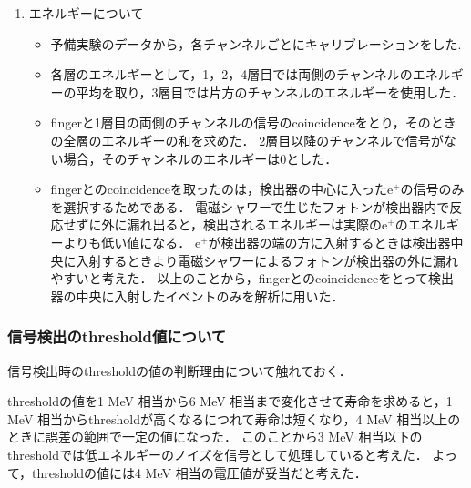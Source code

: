 \begin{enumerate}
\begin{itemize}
	 \end{itemize}
   \item エネルギーについて
	 \begin{itemize}
	  \item 予備実験のデータから，各チャンネルごとにキャリブレーションをした.%
	  \item 各層のエネルギーとして，1，2，4層目では両側のチャンネルのエネルギーの平均を取り，3層目では片方のチャンネルのエネルギーを使用した．
	  \item fingerと1層目の両側のチャンネルの信号のcoincidenceをとり，そのときの全層のエネルギーの和を求めた．
		2層目以降のチャンネルで信号がない場合，そのチャンネルのエネルギーは0とした．
	  \item fingerとのcoincidenceを取ったのは，検出器の中心に入ったe$^{+}$の信号のみを選択するためである．
		電磁シャワーで生じたフォトンが検出器内で反応せずに外に漏れ出ると，検出されるエネルギーは実際のe$^{+}$のエネルギーよりも低い値になる．
		e$^{+}$が検出器の端の方に入射するときは検出器中央に入射するときより電磁シャワーによるフォトンが検出器の外に漏れやすいと考えた．
		以上のことから，fingerとのcoincidenceをとって検出器の中央に入射したイベントのみを解析に用いた．
	 \end{itemize}
  \end{enumerate}
  
  \subsubsection{信号検出のthreshold値について}
  信号検出時のthresholdの値の判断理由について触れておく．
  
  thresholdの値を1 MeV 相当から6 MeV 相当まで変化させて寿命を求めると，1 MeV 相当からthresholdが高くなるにつれて寿命は短くなり，4 MeV 相当以上のときに誤差の範囲で一定の値になった．
  このことから3 MeV 相当以下のthresholdでは低エネルギーのノイズを信号として処理していると考えた．
  よって，thresholdの値には4 MeV 相当の電圧値が妥当だと考えた．

  


